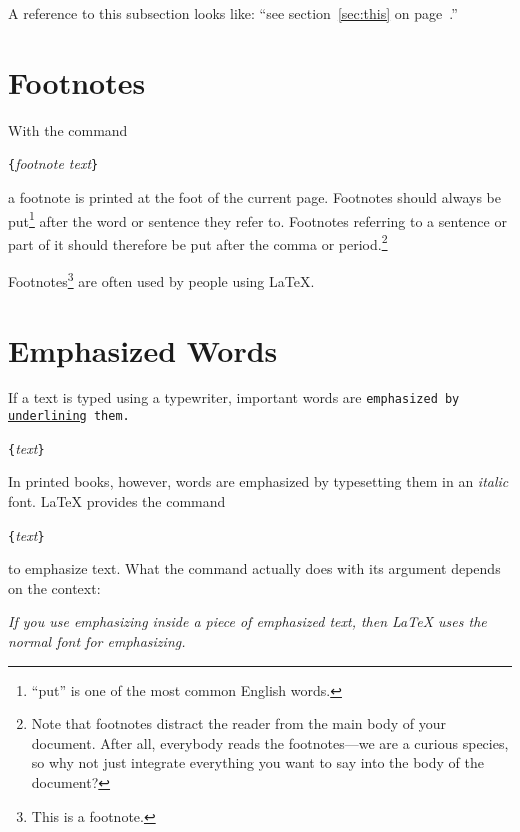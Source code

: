 \begin{example}
A reference to this subsection
\label{sec:this} looks like:
``see section~\ref{sec:this} on 
page~\pageref{sec:this}.''
\end{example}
 
\section{Footnotes}
With the command
\begin{lscommand}
\verb|{|\emph{footnote text}\verb|}|
\end{lscommand}
\noindent a footnote is printed at the foot of the current page.  Footnotes
should always be put\footnote{``put'' is one of the most common
  English words.} after the word or sentence they refer to. Footnotes
referring to a sentence or part of it should therefore be put after
the comma or period.\footnote{Note that footnotes
  distract the reader from the main body of your document. After all,
  everybody reads the footnotes---we are a curious species, so why not
  just integrate everything you want to say into the body of the
  document?\footnotemark}

\begin{example}
Footnotes\footnote{This is 
  a footnote.} are often used 
by people using \LaTeX.
\end{example}
 
\section{Emphasized Words}

If a text is typed using a typewriter, important words are
  \texttt{emphasized by \underline{underlining} them.}
\begin{lscommand}
\verb|{|\emph{text}\verb|}|
\end{lscommand}
In printed books,
however, words are emphasized by typesetting them in an \emph{italic}
font.  \LaTeX{} provides the command
\begin{lscommand}
\verb|{|\emph{text}\verb|}|
\end{lscommand}
\noindent to emphasize text.  What the command actually does with 
its argument depends on the context:

\begin{example}
\emph{If you use 
  emphasizing inside a piece
  of emphasized text, then 
  \LaTeX{} uses the
  \emph{normal} font for 
  emphasizing.}
\end{example}

